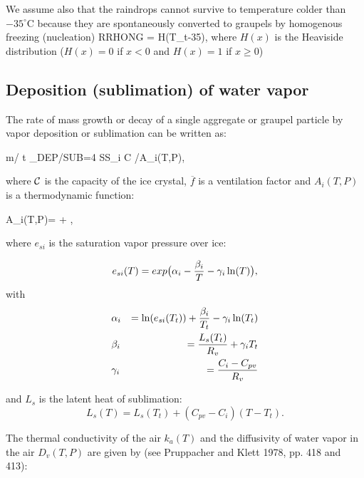 We assume also that the raindrops cannot survive to temperature colder than
$-35^\circ$C because they are spontaneously converted to graupels by homogenous
freezing (nucleation)
%
\be\label{HOM5}
RRHONG =  H(T_t-35),
\ee
\noindent where $H(x)$ is the Heaviside distribution ($H(x)=0$ if $x<0$ and
$H(x)=1$ if $x \ge 0$)


%
\subsection{Deposition (sublimation) of water vapor}
%

The rate of mass growth or decay of a single aggregate or graupel particle by
vapor deposition or sublimation can be written as:

%
\be\label{DEP1}
\partial m/ \partial t \mid_{DEP/SUB}=4 \pi SS_i {\cal C}  /A_{i}(T,P),
\ee
%

\noindent where $\cal C$ is the capacity of the ice crystal, $\overline{f}$ is a
ventilation factor and $A_{i}(T,P)$ is a thermodynamic function:

%
\be\label{DEP2}
A_{i}(T,P)=  +
        ,
\ee
%

\noindent where $e_{si}$ is the saturation vapor pressure over ice:

\begin{equation}
e_{si}(T)= exp \big( \alpha_i - {\beta_i \over T} - \gamma_i \ln (T) \big),
\end{equation}
with
\begin{eqnarray}
&\alpha_i   &= \ln (e_{si}(T_t))+{\beta_i \over T_t} - \gamma_i \ln (T_t) \\
&\beta_i   &= {L_s(T_t) \over R_v} + \gamma_i T_t \\
&\gamma_i  &= {C_i -C_{pv} \over R_v}
\end{eqnarray}

\noindent and $L_s$ is the latent heat of sublimation:
\begin{equation}
L_s(T) = L_s(T_t) + (C_{pv} - C_i)(T-T_t).
\end{equation}

\noindent The thermal conductivity of the air $k_{a}(T)$ and the diffusivity of
water vapor in the air $D_{v}(T,P)$ are given by (see Pruppacher and Klett 1978, pp. 418 and 413):

